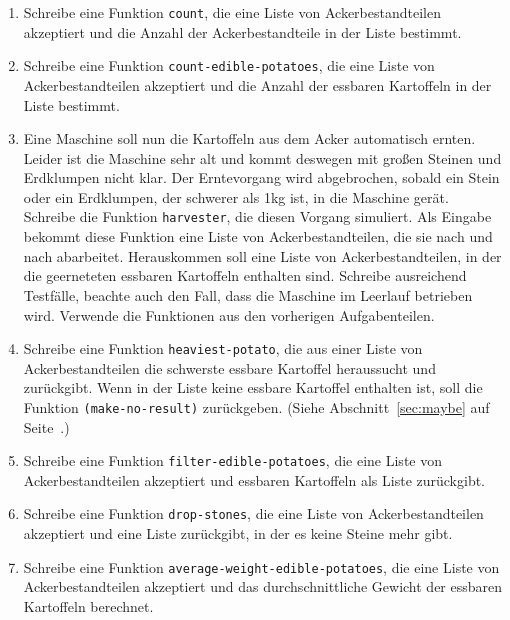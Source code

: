 \begin{aufgabe}
\begin{enumerate}
  \item Schreibe eine Funktion \lstinline{count}, die 
    eine Liste von Ackerbestandteilen akzeptiert und die Anzahl der
    Ackerbestandteile in der Liste bestimmt.

  \item Schreibe eine Funktion
    \lstinline{count-edible-potatoes}, die eine Liste von
    Ackerbestandteilen akzeptiert und die Anzahl der essbaren
    Kartoffeln in der Liste bestimmt.

  \item Eine Maschine soll nun die Kartoffeln aus dem
    Acker automatisch ernten.  Leider ist die Maschine sehr alt und
    kommt deswegen mit großen Steinen und Erdklumpen nicht klar.  Der
    Erntevorgang wird abgebrochen, sobald ein Stein oder ein
    Erdklumpen, der schwerer als 1kg ist, in die Maschine gerät.
    Schreibe die Funktion \lstinline{harvester}, die diesen Vorgang
    simuliert. Als Eingabe bekommt diese Funktion eine Liste von
    Ackerbestandteilen, die sie nach und nach abarbeitet.
    Herauskommen soll eine Liste von Ackerbestandteilen, in der die
    geerneteten essbaren Kartoffeln enthalten sind.  Schreibe
    ausreichend Testfälle, beachte auch den Fall, dass die
    Maschine im Leerlauf betrieben wird.  Verwende die Funktionen
    aus den vorherigen Aufgabenteilen.

  \item Schreibe eine Funktion
    \lstinline{heaviest-potato}, die aus einer Liste von
    Ackerbestandteilen die schwerste essbare Kartoffel heraussucht und
    zurückgibt.  Wenn in der Liste keine essbare Kartoffel enthalten ist, soll
    die Funktion \lstinline{(make-no-result)} zurückgeben. (Siehe
    Abschnitt~\ref{sec:maybe} auf Seite~\pageref{sec:maybe}.)

    \item Schreibe eine Funktion
      \lstinline{filter-edible-potatoes}, die eine Liste von
      Ackerbestandteilen akzeptiert und essbaren Kartoffeln als Liste
      zurückgibt.

    \item Schreibe eine Funktion
      \lstinline{drop-stones}, die eine Liste von Ackerbestandteilen
      akzeptiert und eine Liste zurückgibt, in der es keine Steine mehr
      gibt.

    \item Schreibe eine Funktion
      \lstinline{average-weight-edible-potatoes}, die eine Liste von
      Ackerbestandteilen akzeptiert und das durchschnittliche Gewicht
      der essbaren Kartoffeln berechnet.

  \end{enumerate}
  
\end{aufgabe}

